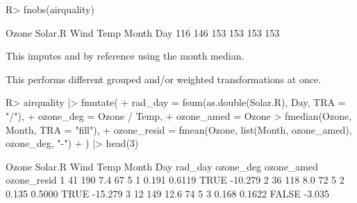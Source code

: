 \documentclass[article]{jss}
\begin{document}
%
\begin{Schunk}
\begin{Sinput}
R> fnobs(airquality)
\end{Sinput}
\begin{Soutput}
  Ozone Solar.R    Wind    Temp   Month     Day 
    116     146     153     153     153     153 
\end{Soutput}
\end{Schunk}
This imputes  and  by reference using the month median.
\begin{Schunk}
\end{Schunk}
This performs different grouped and/or weighted transformations at once.
\begin{Schunk}
\begin{Sinput}
R> airquality |> fmutate(
+    rad_day = fsum(as.double(Solar.R), Day, TRA = "/"),
+    ozone_deg = Ozone / Temp,
+    ozone_amed = Ozone > fmedian(Ozone, Month, TRA = "fill"),
+    ozone_resid = fmean(Ozone, list(Month, ozone_amed), ozone_deg, "-")
+  ) |> head(3)
\end{Sinput}
\begin{Soutput}
  Ozone Solar.R Wind Temp Month Day rad_day ozone_deg ozone_amed ozone_resid
1    41     190  7.4   67     5   1   0.191    0.6119       TRUE     -10.279
2    36     118  8.0   72     5   2   0.135    0.5000       TRUE     -15.279
3    12     149 12.6   74     5   3   0.168    0.1622      FALSE      -3.035
\end{Soutput}
\end{Schunk}
%
\end{document}
